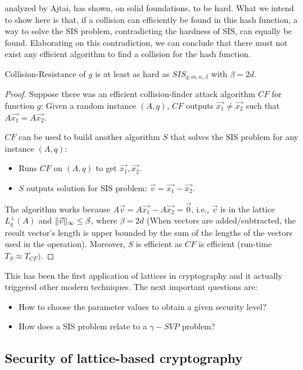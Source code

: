 analyzed by Ajtai, has shown, on solid foundations, to be hard. What we
intend to show here is that, if a collision can efficiently be found in this hash
function, a way to solve the SIS problem, contradicting the hardness of SIS, can equally be found. Elaborating on this contradiction, we can conclude that there must not exist any efficient algorithm to find a collision for the hash function.
\begin{theorem}
  Collision-Resistance of $g$ is at least as hard as $SIS_{q,m,n,\beta}$ with
  $\beta = 2d$.
  \label{the:ajtai hash}
\end{theorem}
\begin{proof}
  Suppose there was an efficient collision-finder attack algorithm $CF$ for
  function $g$: Given a random instance $(A,q)$, $CF$ outputs
  $\vec{x_1} \neq \vec{x_2}$ such that $A\vec{x_1} = A\vec{x_2}$.

$CF$ can be used to build another algorithm $S$ that solves the SIS problem
  for any instance $(A,q)$:
  \begin{itemize}
  \item Runs $CF$ on $(A,q)$ to get $\vec{x_1},\vec{x_2}$.
  \item $S$ outputs solution for SIS problem: $\vec{v} = \vec{x_1} - \vec{x_2}$.
  \end{itemize}

  The algorithm works because $A\vec{v} = A\vec{x_1} - A\vec{x_2} = \vec{0}$,
  i.e., $\vec{v}$ is in the lattice $L_q^\bot(A)$ and
  $\Vert \vec{v} \Vert_{\infty} \leq \beta$, where $\beta = 2d$ (When vectors are added/subtracted, the result vector's length is upper bounded by the sum of the lengths
  of the vectors used in the operation). Moreover, $S$ is efficient as $CF$ is efficient (run-time
  $T_S \approx T_{CF})$.
\end{proof}
This has been the first application of lattices in cryptography and it actually
triggered other modern techniques. The next important questions are:
\begin{itemize}
\item How to choose the parameter values to obtain a given security level?
\item How does a SIS problem relate to a $\gamma-SVP$ problem?
\end{itemize}

\subsection{Security of lattice-based cryptography}
\label{sec:latticeSecurity}

